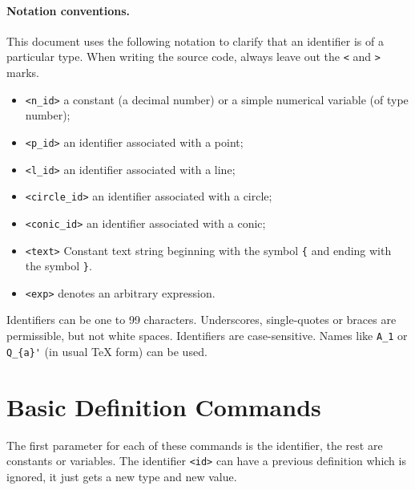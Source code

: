 \documentclass[a4paper]{book}
\begin{document}
\paragraph{Notation conventions.}

This document uses the following notation to clarify that an identifier
is of a particular type. When writing the source code, always leave
out the \verb|<| and \verb|>| marks.

\begin{itemize}
\item \verb|<n_id>| a constant (a decimal number) or a simple
numerical variable (of type {\sc number});
\item \verb|<p_id>| an identifier associated with a {\sc point};
\item \verb|<l_id>| an identifier associated with a {\sc line};
\item \verb|<circle_id>| an identifier associated with a {\sc circle};
\item \verb|<conic_id>| an identifier associated with a {\sc conic};
\item \verb|<text>| Constant text string beginning with the symbol
\verb|{| and ending with the symbol \verb|}|.
\item \verb|<exp>| denotes an arbitrary expression.
\end{itemize}

Identifiers can be one to 99 characters. Underscores, single-quotes 
or braces are permissible, but not white spaces. Identifiers are 
case-sensitive. Names like \verb|A_1| or \verb|Q_{a}'| (in usual 
\TeX{} form) can be used.


\section{Basic Definition Commands}

The first parameter for each of these commands is the identifier, the
rest are constants or variables. The identifier \verb|<id>| can have
a previous definition which is ignored, it just gets a new type and
new value.
\end{document}

